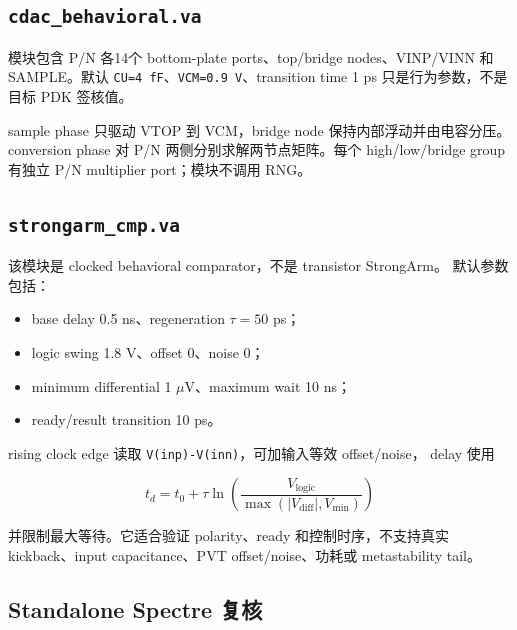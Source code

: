 \documentclass[UTF8,11pt,a4paper]{ctexart}
\newcommand{\code}[1]{\texttt{\small #1}}
\begin{document}
\subsection{\code{cdac\_behavioral.va}}

模块包含 P/N 各14个 bottom-plate ports、top/bridge nodes、VINP/VINN 和
SAMPLE。默认 \code{CU=4 fF}、\code{VCM=0.9 V}、transition time 1 ps
只是行为参数，不是目标 PDK 签核值。

sample phase 只驱动 VTOP 到 VCM，bridge node 保持内部浮动并由电容分压。
conversion phase 对 P/N 两侧分别求解两节点矩阵。每个 high/low/bridge group
有独立 P/N multiplier port；模块不调用 RNG。

\subsection{\code{strongarm\_cmp.va}}

该模块是 clocked behavioral comparator，不是 transistor StrongArm。
默认参数包括：

\begin{itemize}
  \item base delay 0.5 ns、regeneration $\tau=50$ ps；
  \item logic swing 1.8 V、offset 0、noise 0；
  \item minimum differential 1 $\mu$V、maximum wait 10 ns；
  \item ready/result transition 10 ps。
\end{itemize}

rising clock edge 读取 \code{V(inp)-V(inn)}，可加输入等效 offset/noise，
delay 使用

\[
  t_d=t_0+\tau\ln
  \left(
    \frac{V_{\mathrm{logic}}}
    {\max(|V_{\mathrm{diff}}|,V_{\min})}
  \right)
\]

并限制最大等待。它适合验证 polarity、ready 和控制时序，不支持真实
kickback、input capacitance、PVT offset/noise、功耗或 metastability tail。

\subsection{Standalone Spectre 复核}
\end{document}
